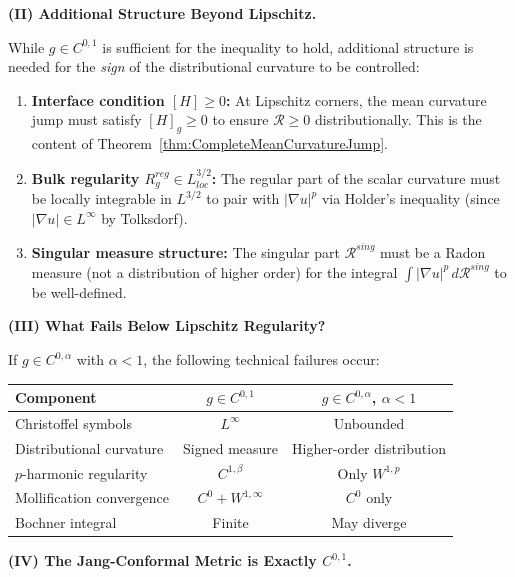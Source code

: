 \begin{remark}
\textbf{(II) Additional Structure Beyond Lipschitz.}

While $g \in C^{0,1}$ is sufficient for the inequality to hold, additional structure is needed for the \emph{sign} of the distributional curvature to be controlled:

\begin{enumerate}
    \item \textbf{Interface condition $[H] \ge 0$:} At Lipschitz corners, the mean curvature jump must satisfy $[H]_g \ge 0$ to ensure $\mathcal{R} \ge 0$ distributionally. This is the content of Theorem~\ref{thm:CompleteMeanCurvatureJump}.
    
    \item \textbf{Bulk regularity $R_g^{reg} \in L^{3/2}_{loc}$:} The regular part of the scalar curvature must be locally integrable in $L^{3/2}$ to pair with $|\nabla u|^p$ via Holder's inequality (since $|\nabla u| \in L^\infty$ by Tolksdorf).
    
    \item \textbf{Singular measure structure:} The singular part $\mathcal{R}^{sing}$ must be a Radon measure (not a distribution of higher order) for the integral $\int |\nabla u|^p \, d\mathcal{R}^{sing}$ to be well-defined.
\end{enumerate}

\textbf{(III) What Fails Below Lipschitz Regularity?}

If $g \in C^{0,\alpha}$ with $\alpha < 1$, the following technical failures occur:

\begin{center}
\begin{tabular}{|l|c|c|}
\hline
\textbf{Component} & \textbf{$g \in C^{0,1}$} & \textbf{$g \in C^{0,\alpha}$, $\alpha < 1$} \\
\hline
Christoffel symbols & $L^\infty$ & Unbounded \\
Distributional curvature & Signed measure & Higher-order distribution \\
$p$-harmonic regularity & $C^{1,\beta}$ & Only $W^{1,p}$ \\
Mollification convergence & $C^0 + W^{1,\infty}$ & $C^0$ only \\
Bochner integral & Finite & May diverge \\
\hline
\end{tabular}
\end{center}

\textbf{(IV) The Jang-Conformal Metric is Exactly $C^{0,1}$.}


\end{remark}

